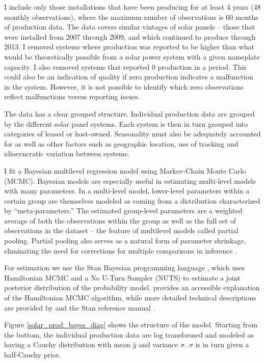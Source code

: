 \documentclass[12pt]{article}
\begin{document}
I include only those installations that have been producing for at least 4 years (48 monthly observations), where the maximum number of observations is 60 months of production data. The data covers similar vintages of solar panels -- those that were installed from 2007 through 2009, and which continued to produce through 2013. I removed systems where production was reported to be higher than what would be theoretically possible from a solar power system with a given nameplate capacity. I also removed systems that reported 0 production in a period. This could also be an indication of quality if zero production indicates a malfunction in the system. However, it is not possible to identify which zero observations reflect malfunctions versus reporting issues. 

The data has a clear grouped structure. Individual production data are grouped by the different solar panel systems. Each system is then in turn grouped into categories of leased or host-owned. Seasonality must also be adequately accounted for as well as other factors such as geographic location, use of tracking and idiosyncratic variation between systems.

I fit a Bayesian multilevel regression model using Markov-Chain Monte Carlo (MCMC). Bayesian models are especially useful in estimating multi-level models with many parameters. In a multi-level model, lower-level parameters within a certain group are themselves modeled as coming from a distribution characterized by ``meta-parameters.'' The estimated group-level parameters are a weighted average of both the observations within the group as well as the full set of observations in the dataset -- the feature of multilevel models called partial pooling. Partial pooling also serves as a natural form of parameter shrinkage, eliminating the need for corrections for multiple comparisons in inference \citep{gelman_data_2006}. 

For estimation we use the Stan Bayesian programming language \citep{stan_development_team_stan_2014}, which uses Hamiltonian MCMC and a No U-Turn Sampler (NUTS) to estimate a joint posterior distribution of the probability model. \citet{kruschke_doing_2014} provides an accessible explanation of the Hamiltonian MCMC algorithm, while more detailed technical descriptions are provided by \citet{gelman_bayesian_2013} and the Stan reference manual \citep{stan_development_team_stan_2014}.

Figure \ref{solar_prod_bayes_diag} shows the structure of the model. Starting from the bottom, the individual production data are log transformed and modeled as having a Cauchy distribution with mean $\hat{y}$ and variance $\sigma$. $\sigma$ is in turn given a half-Cauchy prior. 
\end{document}
